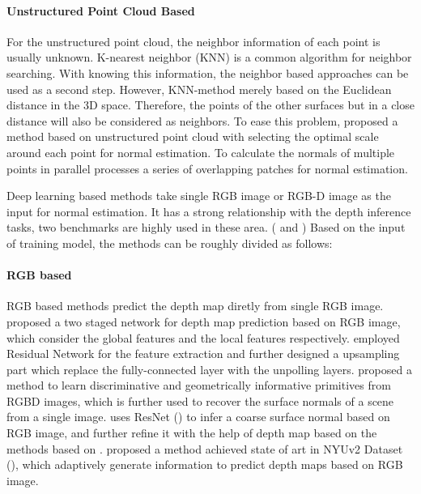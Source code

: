 



\paragraph{Unstructured Point Cloud Based}
For the unstructured point cloud, the neighbor information of each point is usually unknown. K-nearest neighbor (KNN) is a common algorithm for neighbor searching. With knowing this information, the neighbor based approaches can be used as a second step. However, KNN-method merely based on the Euclidean distance in the 3D space. Therefore, the points of the other surfaces but in a close distance will also be considered as neighbors. To ease this problem, \cite{unstructed-pc} proposed a method based on unstructured point cloud with selecting the optimal scale around each point for normal estimation. To calculate the normals of multiple points in parallel \cite{unstructed-pc-patch-stitching} processes a series of overlapping patches for normal estimation. 



Deep learning based methods take single RGB image or RGB-D image as the input for normal estimation. It has a strong relationship with the depth inference tasks, two benchmarks are highly used in these area. (\cite{nyu} and \cite{kitti-depth}) Based on the input of training model, the methods can be roughly divided as follows: 



\paragraph{RGB based} RGB based methods predict the depth map diretly from single RGB image.
\cite{Eigen} proposed a two staged network for depth map prediction based on RGB image, which consider the global features and the local features respectively. \cite{img2depth} employed Residual Network for the feature extraction and further designed a upsampling part which replace the fully-connected layer with the unpolling layers. 
\cite{geometry_based_solution} proposed a method to learn discriminative and geometrically informative primitives from RGBD images, which is further used to recover the surface normals of a scene from a single image. 
\cite{GeoNet} uses ResNet (\cite{resnet}) to infer a coarse surface normal based on RGB image, and further refine it with the help of depth map based on the methods based on \cite{geometry_based_solution}. \cite{binsformer} proposed a method achieved state of art in NYUv2 Dataset (\cite{nyu}), which adaptively generate information to predict depth maps based on RGB image.


